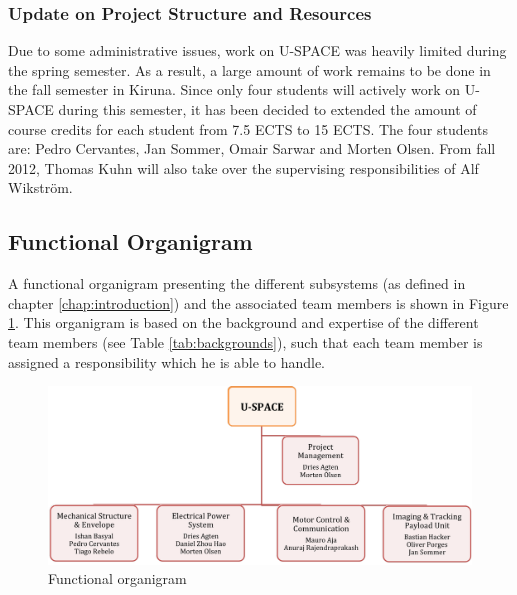 \subsubsection{Update on Project Structure and Resources}
Due to some administrative issues, work on U-SPACE was heavily limited during the spring semester. As a result, a large amount of work remains to be done in the fall semester in Kiruna. Since only four students will actively work on U-SPACE during this semester, it has been decided to extended the amount of course credits for each student from 7.5 ECTS to 15 ECTS. The four students are: Pedro Cervantes, Jan Sommer, Omair Sarwar and Morten Olsen. From fall 2012, Thomas Kuhn will also take over the supervising responsibilities of Alf Wikström.
%
\subsection{Functional Organigram}
%
A functional organigram presenting the different subsystems (as defined in chapter \ref{chap:introduction}) and the associated team members is shown in Figure \ref{fig:obs}. This organigram is based on the background and expertise of the different team members (see Table \ref{tab:backgrounds}), such that each team member is assigned a responsibility which he is able to handle.
%
\begin{figure}[bht]
\centering
\includegraphics[width = \textwidth]{figures/obs.png} %
\caption{Functional organigram}
\label{fig:obs}
\end{figure}
%
